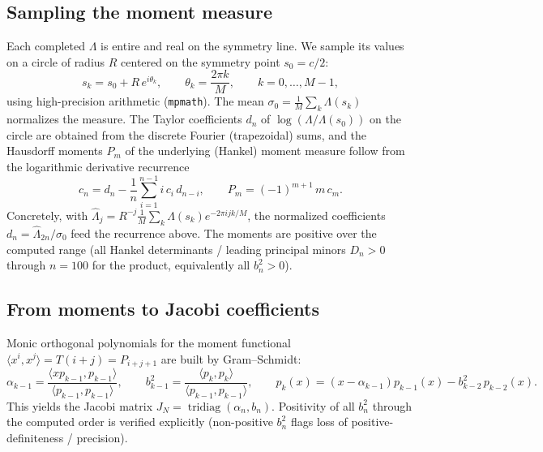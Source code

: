 \documentclass[aps,prx,reprint,floatfix]{revtex4-2}
\begin{document}
\subsection{Sampling the moment measure}
\label{sec:sampling}
Each completed $\Lambda$ is entire and real on the symmetry line. We sample
its values on a circle of radius $R$ centered on the symmetry point
$s_0=c/2$:
\begin{equation}
s_k = s_0 + R\,e^{i\theta_k},\qquad
\theta_k=\frac{2\pi k}{M},\qquad k=0,\dots,M-1,
\end{equation}
using high-precision arithmetic (\texttt{mpmath}). The mean
$\sigma_0=\frac1M\sum_k \Lambda(s_k)$ normalizes the measure. The Taylor
coefficients $d_n$ of $\log(\Lambda/\Lambda(s_0))$ on the circle are obtained
from the discrete Fourier (trapezoidal) sums, and the Hausdorff moments
$P_m$ of the underlying (Hankel) moment measure follow from the logarithmic
derivative recurrence
\begin{equation}
\label{eq:6}
c_n = d_n - \frac1n\sum_{i=1}^{n-1} i\,c_i\,d_{n-i},
\qquad
P_m = (-1)^{m+1}\,m\,c_m .
\end{equation}
Concretely, with $\widehat\Lambda_j=R^{-j}\frac1M\sum_k \Lambda(s_k)
e^{-2\pi i j k/M}$, the normalized coefficients $d_n=\widehat\Lambda_{2n}/\sigma_0$
feed the recurrence above. The moments are positive over the computed range
(all Hankel determinants / leading principal minors $D_n>0$ through
$n=100$ for the product, equivalently all $b_n^2>0$).

\subsection{From moments to Jacobi coefficients}
\label{sec:gs}
Monic orthogonal polynomials for the moment functional
$\langle x^i,x^j\rangle = T(i+j)=P_{i+j+1}$ are built by Gram--Schmidt:
\begin{equation}
\alpha_{k-1}=\frac{\langle xp_{k-1},p_{k-1}\rangle}{\langle p_{k-1},p_{k-1}\rangle},
\qquad
b_{k-1}^2=\frac{\langle p_k,p_k\rangle}{\langle p_{k-1},p_{k-1}\rangle},
\qquad p_k(x)=(x-\alpha_{k-1})p_{k-1}(x)-b_{k-2}^2\,p_{k-2}(x).
\end{equation}
This yields the Jacobi matrix $J_{N}=\operatorname{tridiag}(\alpha_n,b_n)$.
Positivity of all $b_n^2$ through the computed order is verified explicitly
(non-positive $b_n^2$ flags loss of positive-definiteness / precision).
\end{document}
